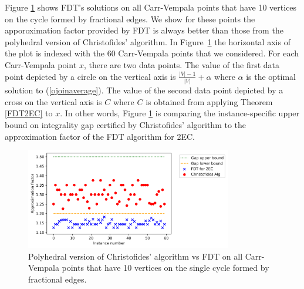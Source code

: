 Figure \ref{fdtvschris} shows FDT's solutions on all Carr-Vempala points that have 10 vertices on the cycle formed by fractional edges. We show for these points the apporoximation factor provided by FDT is always better than those from the polyhedral version of Christofides' algorithm. In Figure~\ref{fdtvschris} the horizontal axis of the plot is indexed with the 60 Carr-Vempala points that we considered. For each Carr-Vempala point $x$, there are two data points. The value of the first data point depicted by a circle on the vertical axis is $\frac{|V|-1}{|V|}+\alpha$  where $\alpha$ is the optimal solution to (\ref{ojoinaverage}).
The value of the second data point depicted by a cross on the vertical axis is $C$ where $C$ is obtained from applying Theorem \ref{FDT2EC} to $x$. In other words, Figure \ref{fdtvschris} is comparing the instance-specific upper bound on integrality gap certified by Christofides' algorithm to the approximation factor of the FDT algorithm for 2EC.
\begin{figure}[h!]
	\centering
	\includegraphics[width=9cm,scale=1.4]{christofides-vs-fdt.png}
	\caption{Polyhedral version of Christofides' algorithm vs FDT on all Carr-Vempala points that have 10 vertices on the single cycle formed by fractional edges.}
	\label{fdtvschris}
\end{figure}
